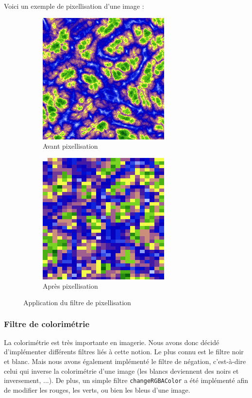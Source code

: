 \documentclass[11pt]{article}
\begin{document}
Voici un exemple de pixellisation d'une image :
 
\begin{figure}[H]
    \centering
    \begin{subfigure}{0.46\textwidth}
    \centering
        \includegraphics[scale=0.45]{pixelateInit.png}
        \caption{Avant pixellisation}
        \label{subfig:avantpixelate}
    \end{subfigure}
    \begin{subfigure}{0.46\textwidth}
    \centering
        \includegraphics[scale=0.45]{pixelateFinal.png}
        \caption{Après pixellisation}
        \label{subfig:aprèspixelate}
    \end{subfigure}
    \caption{Application du filtre de pixellisation}
    \label{fig:pixelate}
\end{figure}
 
\subsubsection{Filtre de colorimétrie}
 
La colorimétrie est très importante en imagerie. Nous avons donc décidé d'implémenter différents filtres liés à cette notion. Le plus connu est le filtre noir et blanc. Mais nous avons également implémenté le filtre de négation, c'est-à-dire celui qui inverse la colorimétrie d'une image (les blancs deviennent des noirs et inversement, ...). De plus, un simple filtre \texttt{changeRGBAColor} a été implémenté afin de modifier les rouges, les verts, ou bien les bleus d'une image. \\
 
\end{document}
